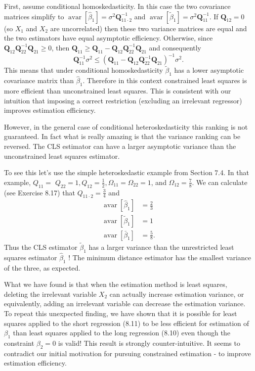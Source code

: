 \documentclass[10pt]{article}
\begin{document}
First, assume conditional homoskedasticity. In this case the two covariance matrices simplify to $\operatorname{avar}\left[\widehat{\beta}_{1}\right]=\sigma^{2} \boldsymbol{Q}_{11 \cdot 2}^{-1}$ and $\operatorname{avar}\left[\widetilde{\beta}_{1}\right]=\sigma^{2} \boldsymbol{Q}_{11}^{-1}$. If $\boldsymbol{Q}_{12}=0$ (so $X_{1}$ and $X_{2}$ are uncorrelated) then these two variance matrices are equal and the two estimators have equal asymptotic efficiency. Otherwise, since $\boldsymbol{Q}_{12} \boldsymbol{Q}_{22}^{-1} \boldsymbol{Q}_{21} \geq 0$, then $\boldsymbol{Q}_{11} \geq \boldsymbol{Q}_{11}-\boldsymbol{Q}_{12} \boldsymbol{Q}_{22}^{-1} \boldsymbol{Q}_{21}$ and consequently
$$
\boldsymbol{Q}_{11}^{-1} \sigma^{2} \leq\left(\boldsymbol{Q}_{11}-\boldsymbol{Q}_{12} \boldsymbol{Q}_{22}^{-1} \boldsymbol{Q}_{21}\right)^{-1} \sigma^{2} .
$$
This means that under conditional homoskedasticity $\widetilde{\beta}_{1}$ has a lower asymptotic covariance matrix than $\widehat{\beta}_{1}$. Therefore in this context constrained least squares is more efficient than unconstrained least squares. This is consistent with our intuition that imposing a correct restriction (excluding an irrelevant regressor) improves estimation efficiency.

However, in the general case of conditional heteroskedasticity this ranking is not guaranteed. In fact what is really amazing is that the variance ranking can be reversed. The CLS estimator can have a larger asymptotic variance than the unconstrained least squares estimator.

To see this let's use the simple heteroskedastic example from Section 7.4. In that example, $Q_{11}=$ $Q_{22}=1, Q_{12}=\frac{1}{2}, \Omega_{11}=\Omega_{22}=1$, and $\Omega_{12}=\frac{7}{8}$. We can calculate (see Exercise 8.17) that $Q_{11 \cdot 2}=\frac{3}{4}$ and
$$
\begin{aligned}
\operatorname{avar}\left[\widehat{\beta}_{1}\right] &=\frac{2}{3} \\
\operatorname{avar}\left[\widetilde{\beta}_{1}\right] &=1 \\
\operatorname{avar}\left[\bar{\beta}_{1}\right] &=\frac{5}{8} .
\end{aligned}
$$
Thus the CLS estimator $\widetilde{\beta}_{1}$ has a larger variance than the unrestricted least squares estimator $\widehat{\beta}_{1}$ ! The minimum distance estimator has the smallest variance of the three, as expected.

What we have found is that when the estimation method is least squares, deleting the irrelevant variable $X_{2}$ can actually increase estimation variance, or equivalently, adding an irrelevant variable can decrease the estimation variance. To repeat this unexpected finding, we have shown that it is possible for least squares applied to the short regression (8.11) to be less efficient for estimation of $\beta_{1}$ than least squares applied to the long regression (8.10) even though the constraint $\beta_{2}=0$ is valid! This result is strongly counter-intuitive. It seems to contradict our initial motivation for pursuing constrained estimation - to improve estimation efficiency.
\end{document}

